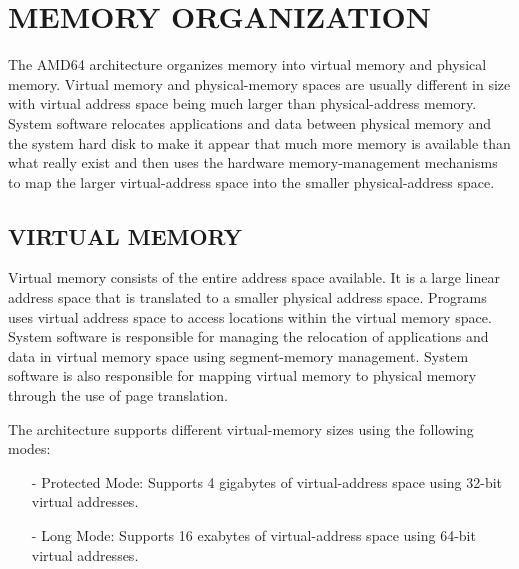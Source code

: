 \documentclass[a4paper,12pt]{report}
\begin{document}
\section{MEMORY ORGANIZATION}

The AMD64 architecture organizes memory into virtual memory and physical memory. Virtual memory and physical-memory spaces are usually different in size with virtual address space being much larger than physical-address memory.  System software relocates applications and data between physical memory and the system hard disk to make it appear that much more memory is available than what really exist and then uses the hardware memory-management mechanisms to map the larger virtual-address space into the smaller physical-address space.

\subsection {VIRTUAL MEMORY}
Virtual memory consists of the entire address space available. It is a large linear address space that is translated to a smaller physical address space. Programs uses virtual address space to access locations within the virtual memory space. System software is responsible for managing the relocation of applications and data in virtual memory space using segment-memory management. System software is also responsible for mapping virtual memory to physical memory through the use of page translation.

The architecture supports different virtual-memory sizes using the following modes:
\begin{itemize}

\item[-] Protected Mode: Supports 4 gigabytes of virtual-address space using 32-bit virtual  addresses.

\item[-] Long Mode: Supports 16 exabytes of virtual-address space using 64-bit virtual addresses.
\end{itemize}
\end{document}
